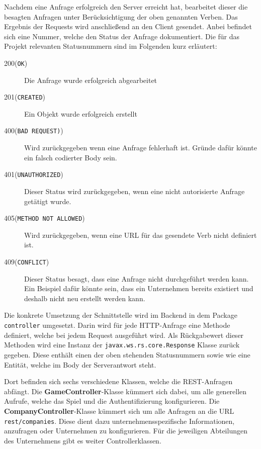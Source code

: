 Nachdem eine Anfrage erfolgreich den Server erreicht hat, bearbeitet dieser die besagten Anfragen unter Berücksichtigung der oben genannten Verben. Das Ergebnis der Requests wird anschließend an den Client gesendet. Anbei befindet sich eine Nummer, welche den Status der Anfrage dokumentiert. Die für das Projekt relevanten Statusnummern sind im Folgenden kurz erläutert:


\begin{description}
	\item[200(\texttt{OK})] Die Anfrage wurde erfolgreich abgearbeitet
	\item[201(\texttt{CREATED})] Ein Objekt wurde erfolgreich erstellt
	
	\item[400(\texttt{BAD REQUEST)})] Wird zurückgegeben wenn eine Anfrage fehlerhaft ist. Gründe dafür könnte ein falsch codierter Body sein.
	\item[401(\texttt{UNAUTHORIZED})] Dieser Status wird zurückgegeben, wenn eine nicht autorisierte Anfrage getätigt wurde.
	\item[405(\texttt{METHOD NOT ALLOWED})] Wird zurückgegeben, wenn eine URL für das gesendete Verb nicht definiert ist.
	\item[409(\texttt{CONFLICT})] Dieser Status besagt, dass eine Anfrage nicht durchgeführt werden kann. Ein Beispiel dafür könnte sein, dass ein Unternehmen bereits existiert und deshalb nicht neu erstellt werden kann.
\end{description}

Die konkrete Umsetzung der Schnittstelle wird im Backend in dem Package \texttt{controller} umgesetzt. 
Darin wird für jede \ac{HTTP}-Anfrage eine Methode definiert, welche bei jedem Request ausgeführt wird.
Als Rückgabewert dieser Methoden wird eine Instanz der \texttt{javax.ws.rs.core.Response} Klasse zurück gegeben.
Diese enthält einen der oben stehenden Statusnummern sowie wie eine Entität, welche im Body der Serverantwort steht.


Dort befinden sich sechs verschiedene Klassen, welche die \ac{REST}-Anfragen abfängt. Die \textbf{GameController}-Klasse kümmert sich dabei, um alle generellen Aufrufe, welche das Spiel und die Authentifizierung konfigurieren.
Die \textbf{CompanyController}-Klasse kümmert sich um alle Anfragen an die URL \texttt{rest/companies}. Diese dient dazu unternehmensspezifische Informationen, anzufragen oder Unternehmen zu konfigurieren. Für die jeweiligen Abteilungen des Unternehmens gibt es weiter Controllerklassen. 


